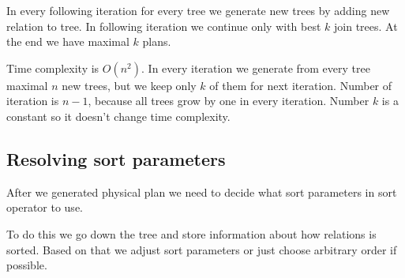  In every following iteration for every tree we generate new trees by adding new relation to tree. In following iteration we continue only with best $k$ join trees. At the end we have maximal $k$ plans.
 
 Time complexity is $O(n^2)$. In every iteration we generate from every tree maximal $n$ new trees, but we keep only $k$ of them for next iteration. Number of iteration is $n-1$, because all trees grow by one in every iteration. Number $k$ is a constant so it doesn't change time complexity.
 
\subsection{Resolving sort parameters}

After we generated physical plan we need to decide what sort parameters in sort operator to use.

To do this we go down the tree and store information about how relations is sorted. Based on that we adjust sort parameters or just choose arbitrary order if possible.

